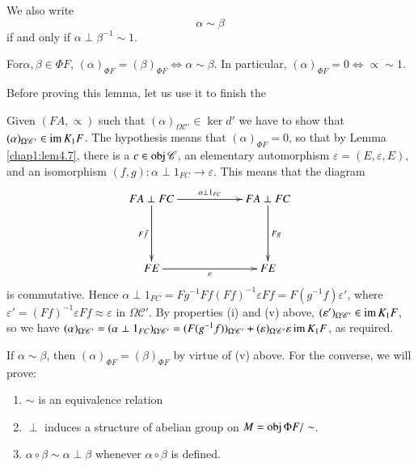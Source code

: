 We also write 
$$
\alpha \sim \beta
$$
if and only if $\alpha \perp \beta^{-1} \sim 1$.

\setcounter{lemma}{6}
\begin{lemma}\label{chap1:lem4.7} %
For\pageoriginale $\alpha, \beta \in \Phi F$, $(\alpha)_{\Phi F} =
(\beta)_{\Phi F} 
\Leftrightarrow \alpha \sim  \beta$. In particular, $(\alpha)_{\Phi F} = 0
\Leftrightarrow \propto \sim 1$. 
\end{lemma}

Before proving this lemma, let us use it to finish the 

\setcounter{proofofthm}{5}
\begin{proofofthm}%
Given $(FA, \propto )$ such that $(\alpha)_{\Omega \mathscr{C}'} \in
\ker d'$ we have to show that $(\alpha)_{\Omega \mathscr{C}'} \in \operatorname{im}
K_1 F$. The hypothesis means that $(\alpha)_{\Phi F} = 0$, so that by
Lemma \ref{chap1:lem4.7}, there is a $c \in \operatorname{obj} \mathscr{C}$, an elementary
automorphism $\varepsilon = (E, \varepsilon, E)$, and an isomorphism
$(f, g) : \alpha \perp 1_{FC} \to \varepsilon$. This means that the
diagram  
\[
\xymatrix@R=1.7cm@C=2cm{
FA \perp FC \ar[r]^{\alpha \perp 1_{FC}} \ar[d]_{F\bar{f}} & FA \perp
FC \ar[d]^{Fg} \\
FE \ar[r]_{\varepsilon} & FE
}
\]
is commutative. Hence $\alpha \perp 1_{FC} = Fg^{-1} Ff(Ff)^{-1}
\varepsilon Ff = F(g^{-1 }f) \varepsilon'$, where $\varepsilon' =
(Ff)^{-1} \varepsilon Ff \approx \varepsilon $ in $\Omega
\mathscr{C}'$. By properties (i) and (v) above,
$(\varepsilon')_{\Omega \mathscr{C}'} \in \operatorname{im} K_1 F$, so we have
$(\alpha)_{\Omega \mathscr{C}'} = (\alpha \perp 1_{FC})_{\Omega
  \mathscr{C}'}= (F(g^{-1} f))_{\Omega \mathscr{C}'} +
(\varepsilon)_{\Omega \mathscr{C}'} \varepsilon \operatorname{im} K_1 F$, as
required. 
\end{proofofthm}

\setcounter{proofoflemma}{6}
\begin{proofoflemma}%
 If $\alpha \sim \beta$, then $(\alpha)_{\Phi F} = (\beta)_{\Phi F}$
 by virtue of (v) above. For the converse, we will prove: 
\begin{enumerate}
\renewcommand{\theenumi}{\alph{enumi}}
\renewcommand{\labelenumi}{(\theenumi)}
\item $\sim$ is an equivalence relation 

\item $\perp$ induces a structure of abelian group on $M = \operatorname{obj} \Phi
  F/ \sim$. 

\item $\alpha \circ \beta \sim \alpha \perp \beta$ whenever $\alpha \circ
  \beta$ is defined. 
\end{enumerate}
\end{proofoflemma}

